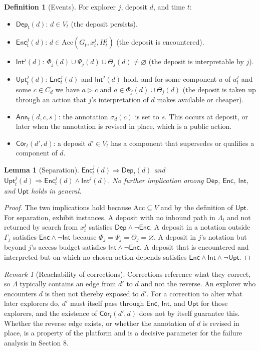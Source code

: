 \documentclass[11pt]{article}
\newtheorem{lemma}[proposition]{Lemma}
\theoremstyle{definition}
\newtheorem{definition}[proposition]{Definition}
\theoremstyle{remark}
\newtheorem{remark}[proposition]{Remark}
\newcommand{\Acc}{\mathrm{Acc}}
\newcommand{\Dep}{\mathsf{Dep}}
\newcommand{\Enc}{\mathsf{Enc}}
\newcommand{\Int}{\mathsf{Int}}
\newcommand{\Upt}{\mathsf{Upt}}
\newcommand{\Cor}{\mathsf{Cor}}
\begin{document}
\begin{definition}[Events]\label{def:events}
For explorer $j$, deposit $d$, and time $t$:
\begin{itemize}
\item $\Dep_t(d)$: $d\in V_t$ (the deposit persists).
\item $\Enc_t^j(d)$: $d\in\Acc(G_t,x_t^j,H_t^j)$ (the deposit is encountered).
\item $\Int^j(d)$: $\Phi_j(d)\cup\Psi_j(d)\cup\Theta_j(d)\neq\varnothing$ (the deposit is interpretable by $j$).
\item $\Upt_t^j(d)$: $\Enc_t^j(d)$ and $\Int^j(d)$ hold, and for some component $a$ of $a_t^j$ and some $c\in C_d$ we have $a\rhd c$ and $a\in\Phi_j(d)\cup\Theta_j(d)$ (the deposit is taken up through an action that $j$'s interpretation of $d$ makes available or cheaper).
\item $\mathsf{Ann}_t(d,c,s)$: the annotation $\sigma_d(c)$ is set to $s$. This occurs at deposit, or later when the annotation is revised in place, which is a public action.
\item $\Cor_t(d',d)$: a deposit $d'\in V_t$ has a component that supersedes or qualifies a component of $d$.
\end{itemize}
\end{definition}

\begin{lemma}[Separation]\label{lem:sep}
$\Enc_t^j(d)\Rightarrow\Dep_t(d)$ and $\Upt_t^j(d)\Rightarrow\Enc_t^j(d)\wedge\Int^j(d)$. No further implication among $\Dep$, $\Enc$, $\Int$, and $\Upt$ holds in general.
\end{lemma}
\begin{proof}
The two implications hold because $\Acc\subseteq V$ and by the definition of $\Upt$. For separation, exhibit instances. A deposit with no inbound path in $\Lambda_t$ and not returned by search from $x_t^j$ satisfies $\Dep\wedge\neg\Enc$. A deposit in a notation outside $\Gamma_j$ satisfies $\Enc\wedge\neg\Int$ because $\Phi_j=\Psi_j=\Theta_j=\varnothing$. A deposit in $j$'s notation but beyond $j$'s access budget satisfies $\Int\wedge\neg\Enc$. A deposit that is encountered and interpreted but on which no chosen action depends satisfies $\Enc\wedge\Int\wedge\neg\Upt$.
\end{proof}

\begin{remark}[Reachability of corrections]
Corrections reference what they correct, so $\Lambda$ typically contains an edge from $d'$ to $d$ and not the reverse. An explorer who encounters $d$ is then not thereby exposed to $d'$. For a correction to alter what later explorers do, $d'$ must itself pass through $\Enc$, $\Int$, and $\Upt$ for those explorers, and the existence of $\Cor_t(d',d)$ does not by itself guarantee this. Whether the reverse edge exists, or whether the annotation of $d$ is revised in place, is a property of the platform and is a decisive parameter for the failure analysis in Section 8.
\end{remark}
\end{document}
